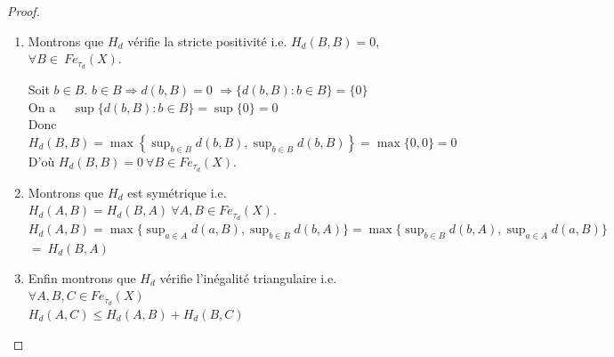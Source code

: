 \documentclass[11pt]{report}
\theoremstyle{styletheorem}
\theoremstyle{styledef}
\theoremstyle{remark}
\begin{document}
\begin{proof}
\begin{enumerate}
\begin{itemize}
			D'où $ H_d \ : \ Fe_{\tau_d}(X) \times Fe_{\tau_{d}}(X) \longrightarrow \mathbb{R} $ avec $0 \leq H_{d}(A,B)$
		\end{itemize}
		
		\item Montrons que $H_d$ vérifie la stricte positivité i.e. $H_d (B,B) = 0$, $\forall B \in~ Fe_{\tau_d}(X) $.
		
		Soit $b \in B$. $b \in B \Rightarrow d(b,B) = 0 $ $\Rightarrow \lbrace d(b,B) : b \in B \rbrace = \lbrace 0 \rbrace$\\
		On a~~ $\sup \lbrace d(b,B) : b \in B \rbrace = \sup \lbrace 0 \rbrace = 0 $\\ 
		Donc $H_d (B,B) = \max \left\lbrace \sup_{b \in B} d(b,B), \sup_{b \in B} d(b,B) \right\rbrace = \max \lbrace 0, 0 \rbrace = 0$\\
		D'où $H_d (B,B) = 0 \ \forall B \in Fe_{\tau_{d}}(X) $.
		\item Montrons que $H_d$ est symétrique i.e. $H_d (A,B) = H_d (B,A) \ \forall A,B \in Fe_{\tau_{d}}(X).$\\
		
		
		$H_d (A,B) =  \max \lbrace \sup_{a \in A} d(a,B), \sup_{b \in B} d(b,A) \rbrace = \max \lbrace \sup_{b \in B} d(b,A), \sup_{a \in A} d(a,B)\rbrace $ $= ~H_{d} (B,A)  $
		
		\item  Enfin montrons que $H_d$ vérifie l'inégalité triangulaire i.e. $ \forall A,B,C \in Fe_{\tau_d}(X)$ \\ $  H_d (A,C) \leq H_d (A,B) + H_d (B,C) \ $
		

\end{enumerate}
\end{proof}
\end{document}
